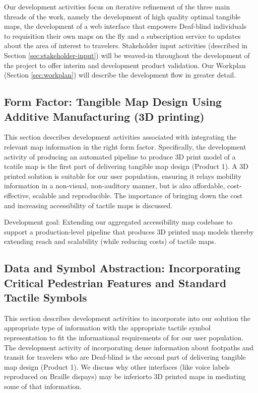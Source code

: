 Our development activities focus on iterative refinement of the
three main threads of the work, namely the development of high quality
optimal tangible maps, the development of a web interface that
empowers Deaf-blind individuals to requisition their own maps on the
fly and a subscription service to updates about the area of interest to travelers. Stakeholder input activities (described in Section \ref{sec:stakeholder-input}) will be weaved-in throughout the development of the project to offer interim and development product validation. Our Workplan (Section \ref{sec:workplan}) will describe the development flow in greater detail.

\subsection{Form Factor: Tangible Map Design Using Additive Manufacturing (3D printing)}
This section describes development activities associated with integrating the relevant map information in the right form factor. Specifically, the development activity of producing an automated pipeline to produce 3D print model of a tcatile map is the first part of delivering tangible map design (Product 1). A 3D printed solution is suitable for our user population, ensuring it relays mobility information in a non-visual, non-auditory manner, but is also affordable, cost-effective, scalable and reproducible.  The importance of bringing down the cost and increasing accessibility of tactile maps is discussed.

Development goal: Extending our aggregated accessibility map codebase to support a production-level pipeline that produces 3D printed map models thereby extending reach and scalability (while reducing costs) of tactile maps.  

\label{sec:fabrication}


\subsection{Data and Symbol Abstraction: Incorporating Critical Pedestrian Features and Standard Tactile Symbols}

This section describes development activities to incorporate into our solution the appropriate type of information with the appropriate tactile symbol representation to fit the informational requirements of for our user population. 
The development activity of incorporating dense information about footpaths and transit for travelers who are Deaf-blind is the second part of delivering tangible map design (Product 1). 
We discuss why other interfaces (like voice labels reproduced on Braille dispays) may be inferiorto 3D printed maps in mediating some of that information.

